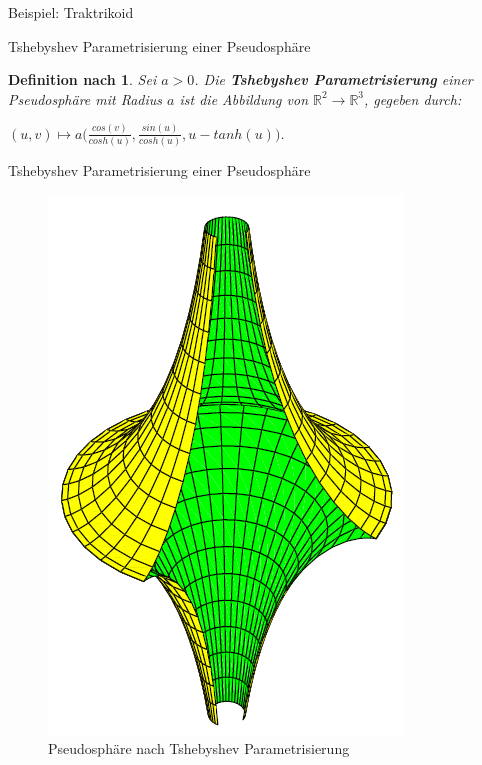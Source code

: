 \documentclass[12pt]{beamer}
\newtheorem{mydef}{Definition nach \cite{gray}}
\begin{document}
\begin{frame}{Beispiel: Traktrikoid}
\begin{figure}
\end{figure}

\end{frame}

\begin{frame}{Tshebyshev Parametrisierung einer Pseudosphäre}
\begin{mydef}
Sei $a > 0$. Die \textbf{Tshebyshev Parametrisierung} einer Pseudosphäre mit Radius $a$ ist die Abbildung von $\mathbb{R}^2 \rightarrow \mathbb{R}^3$, gegeben durch:
\begin{center}
$(u,v) \mapsto a\Big(\frac{cos(v)}{cosh(u)}, \frac{sin(u)}{cosh(u)}, u - tanh(u)\Big)$.
\end{center}
\end{mydef}
\end{frame}

\begin{frame}{Tshebyshev Parametrisierung einer Pseudosphäre}
\begin{figure}[h!]
\includegraphics[scale=0.5]{pseudosphere_tchebyshev.png}
\caption{Pseudosphäre nach Tshebyshev Parametrisierung}
\end{figure}
\end{frame}
\end{document}
